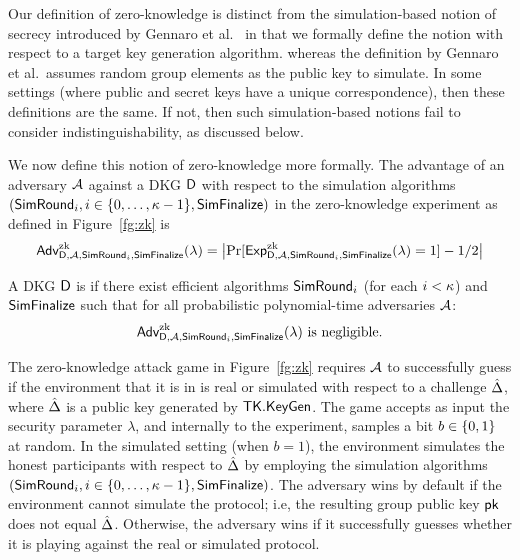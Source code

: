 Our definition of zero-knowledge is distinct from the simulation-based notion of secrecy
introduced by Gennaro et al.~\cite{GennaroJKR07} in that we formally define the
notion with respect to a target key generation algorithm.
whereas the definition by Gennaro et al.\ assumes random group elements
as the public key to simulate.
In some settings (where public and secret keys have a unique correspondence),
then these definitions are the same.
If not, then such simulation-based notions fail to consider
indistinguishability, as discussed below.

We now define this notion of zero-knowledge more formally.
The advantage of an adversary $\mathcal{A}$ against a DKG $\mathsf{D}$
with respect to the simulation algorithms $(\mathsf{SimRound}_i, i \in \{0,\ldots,\kappa-1 \}, \mathsf{SimFinalize})$
in the zero-knowledge experiment as defined in Figure~\ref{fg:zk}
is
\[
  \textsf{\upshape Adv}^{\textrm{\upshape zk}}_{\mathsf{D},\mathcal{A},\mathsf{SimRound}_i,\mathsf{SimFinalize}}(\lambda) = \bigl| \Pr[\textsf{Exp}^{\textrm{zk}}_{\mathsf{D},\mathcal{A},\mathsf{SimRound}_i,\mathsf{SimFinalize}}(\lambda) = 1 ] - 1/2    \bigr|
\]

\begin{sloppypar}
\begin{definition}
  A DKG $\mathsf{D}$ is  if there exist efficient algorithms
  $\mathsf{SimRound}_i$ (for each $i < \kappa$) and $\mathsf{SimFinalize}$\allowbreak{} such that
  for all probabilistic polynomial-time adversaries $\mathcal{A}$:
  \[
    \textsf{\upshape Adv}^{\textrm{\upshape zk}}_{\mathsf{D},\mathcal{A},\mathsf{SimRound}_i,\mathsf{SimFinalize}}(\lambda) \text{ is negligible.}
  \]
\end{definition}
\end{sloppypar}

The zero-knowledge attack game in Figure~\ref{fg:zk} requires $\mathcal{A}$ to successfully guess if the environment that it is in is real or simulated with respect to a challenge $\hat{\Delta}$,
where $\hat{\Delta}$ is a public key generated by $\mathsf{TK}.\mathsf{KeyGen}$.
The game accepts as input the security parameter $\lambda$,
and internally to the experiment, samples a bit $b \in \{ 0, 1\}$ at random.
In the simulated setting (when $b=1$),
the environment simulates the honest participants with respect to $\hat{\Delta}$ by
employing the simulation algorithms $(\mathsf{SimRound}_i, i \in \{0,\ldots,\kappa-1 \}, \mathsf{SimFinalize})$.
The adversary wins by default if the environment cannot simulate the protocol;
i.e, the resulting group public key $\mathsf{pk}$ does not equal $\hat{\Delta}$.
Otherwise, the adversary wins if it successfully guesses whether it is playing against the real or simulated protocol.


